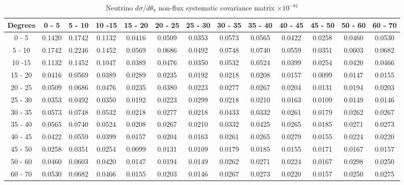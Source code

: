 \documentclass[aps,prl,twocolumn,showpacs,superscriptaddress,nofootinbib]{revtex4}
\begin{document}
\begingroup
\squeezetable
\begin{table}[h]
\tabcolsep=0.11cm
\begin{tabular}{c|cccccccccccc}
Degrees & 0 - 5 & 5 - 10 & 10 -15 & 15 - 20 & 20 - 25 & 25 - 30 & 30 - 35 & 35 - 40 & 40 - 45 & 45 - 50 & 50 - 60 & 60 - 70 \\
\hline
0 - 5&0.1420 & 0.1742 & 0.1132 & 0.0416 & 0.0509 & 0.0353 & 0.0573 & 0.0565 & 0.0422 & 0.0258 & 0.0460 & 0.0530  \\
5 - 10 &0.1742 & 0.2246 & 0.1452 & 0.0569 & 0.0686 & 0.0492 & 0.0748 & 0.0740 & 0.0559 & 0.0351 & 0.0603 & 0.0682  \\
10 -15 &0.1132 & 0.1452 & 0.1047 & 0.0389 & 0.0476 & 0.0350 & 0.0532 & 0.0524 & 0.0399 & 0.0254 & 0.0420 & 0.0466  \\
15 - 20 &0.0416 & 0.0569 & 0.0389 & 0.0289 & 0.0235 & 0.0192 & 0.0218 & 0.0208 & 0.0157 & 0.0099 & 0.0147 & 0.0155  \\
20 - 25 &0.0509 & 0.0686 & 0.0476 & 0.0235 & 0.0380 & 0.0223 & 0.0277 & 0.0267 & 0.0204 & 0.0131 & 0.0194 & 0.0203  \\
25 - 30 &0.0353 & 0.0492 & 0.0350 & 0.0192 & 0.0223 & 0.0299 & 0.0218 & 0.0210 & 0.0163 & 0.0109 & 0.0149 & 0.0146  \\
30 - 35 &0.0573 & 0.0748 & 0.0532 & 0.0218 & 0.0277 & 0.0218 & 0.0433 & 0.0332 & 0.0261 & 0.0179 & 0.0262 & 0.0267  \\
35 - 40 &0.0565 & 0.0740 & 0.0524 & 0.0208 & 0.0267 & 0.0210 & 0.0332 & 0.0425 & 0.0265 & 0.0185 & 0.0271 & 0.0273  \\
40 - 45 &0.0422 & 0.0559 & 0.0399 & 0.0157 & 0.0204 & 0.0163 & 0.0261 & 0.0265 & 0.0279 & 0.0155 & 0.0224 & 0.0220  \\
45 - 50 &0.0258 & 0.0351 & 0.0254 & 0.0099 & 0.0131 & 0.0109 & 0.0179 & 0.0185 & 0.0155 & 0.0171 & 0.0167 & 0.0157  \\
50 - 60 &0.0460 & 0.0603 & 0.0420 & 0.0147 & 0.0194 & 0.0149 & 0.0262 & 0.0271 & 0.0224 & 0.0167 & 0.0298 & 0.0250  \\
60 - 70 &0.0530 & 0.0682 & 0.0466 & 0.0155 & 0.0203 & 0.0146 & 0.0267 & 0.0273 & 0.0220 & 0.0157 & 0.0250 & 0.0275  \\
\end{tabular}
\caption{Neutrino $d\sigma/d\theta_\pi$ non-flux systematic covariance matrix  $\times 10^{-81}$ }
\label{tab:thpi-nonflux}
\end{table}
\endgroup
\end{document}

